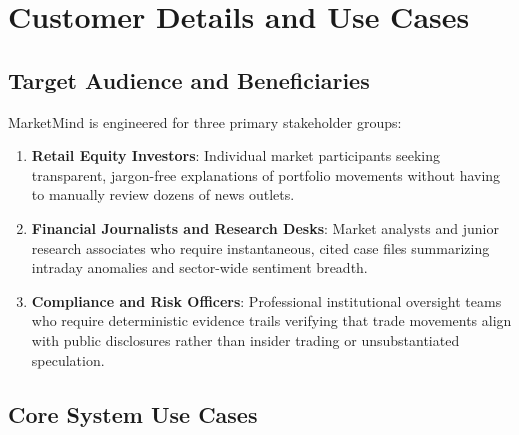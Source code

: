 \documentclass{article}
\begin{document}
	\pagebreak
    \section{Customer Details and Use Cases}

	\subsection{Target Audience and Beneficiaries}
	MarketMind is engineered for three primary stakeholder groups:
	\begin{enumerate}
		\item \textbf{Retail Equity Investors}: Individual market participants seeking transparent, jargon-free explanations of portfolio movements without having to manually review dozens of news outlets.
		\item \textbf{Financial Journalists and Research Desks}: Market analysts and junior research associates who require instantaneous, cited case files summarizing intraday anomalies and sector-wide sentiment breadth.
		\item \textbf{Compliance and Risk Officers}: Professional institutional oversight teams who require deterministic evidence trails verifying that trade movements align with public disclosures rather than insider trading or unsubstantiated speculation.
	\end{enumerate}

	\subsection{Core System Use Cases}
\end{document}
